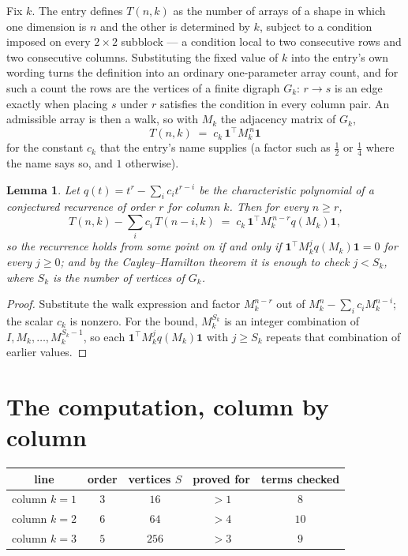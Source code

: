 \documentclass[11pt,a4paper]{article}
\theoremstyle{plain}
\newtheorem{lemma}[theorem]{Lemma}
\theoremstyle{definition}
\begin{document}
Fix $k$. The entry defines $T(n,k)$ as the number of arrays of a shape in which one dimension
is $n$ and the other is determined by $k$, subject to a condition imposed on every
$2\times2$ subblock --- a condition local to two consecutive rows and two consecutive columns.
Substituting the fixed value of $k$ into the entry's own wording turns the definition into an
ordinary one-parameter array count, and for such a count the rows are the vertices of a finite
digraph $G_k$: $r\to s$ is an edge exactly when placing $s$ under $r$ satisfies the condition
in every column pair. An admissible array is then a walk, so with $M_k$ the adjacency matrix
of $G_k$,
\[
T(n,k)\;=\;c_k\,\mathbf{1}^{\!\top}M_k^{\,n}\mathbf{1}
\]
for the constant $c_k$ that the entry's name supplies (a factor such as $\tfrac12$ or
$\tfrac14$ where the name says so, and $1$ otherwise).

\begin{lemma}\label{lem:crit}
Let $q(t)=t^{r}-\sum_i c_it^{r-i}$ be the characteristic polynomial of a conjectured
recurrence of order $r$ for column $k$. Then for every $n\ge r$,
\[
T(n,k)-\sum_i c_i\,T(n-i,k)\;=\;c_k\,\mathbf{1}^{\!\top}M_k^{\,n-r}q(M_k)\mathbf{1},
\]
so the recurrence holds from some point on if and only if
$\mathbf{1}^{\!\top}M_k^{j}q(M_k)\mathbf{1}=0$ for every $j\ge0$; and by the
Cayley--Hamilton theorem it is enough to check $j<S_k$, where $S_k$ is the number of vertices
of $G_k$.
\end{lemma}

\begin{proof}
Substitute the walk expression and factor $M_k^{n-r}$ out of $M_k^{n}-\sum_ic_iM_k^{n-i}$;
the scalar $c_k$ is nonzero. For the bound, $M_k^{S_k}$ is an integer combination of
$I,M_k,\dots,M_k^{S_k-1}$, so each $\mathbf{1}^{\!\top}M_k^{j}q(M_k)\mathbf{1}$ with
$j\ge S_k$ repeats that combination of earlier values.
\end{proof}

\section{The computation, column by column}

\begin{center}
\begin{tabular}{ccccc}
line & order & vertices $S$ & proved for & terms checked \\ \hline
column $k$$=1$ & $3$ & $16$ & $>1$ & $8$ \\
column $k$$=2$ & $6$ & $64$ & $>4$ & $10$ \\
column $k$$=3$ & $5$ & $256$ & $>3$ & $9$ \\
\end{tabular}
\end{center}
\end{document}

